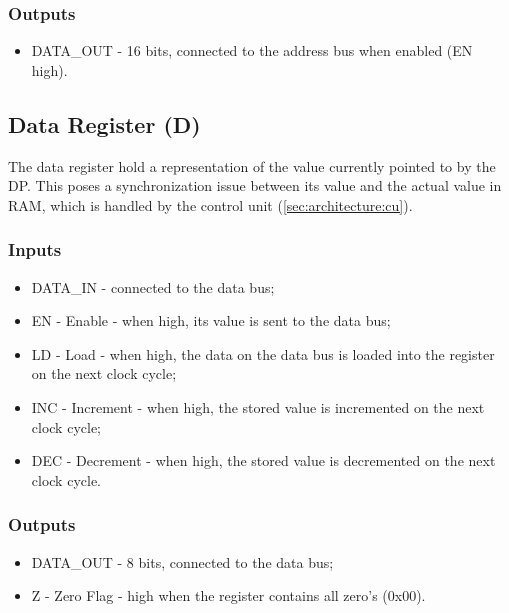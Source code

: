 \subsubsection*{Outputs}
\begin{itemize}
\item DATA\_OUT - 16 bits, connected to the address bus when enabled (EN high).
\end{itemize}

\subsection{Data Register (D)} \label{sec:architecture:d}
The data register hold a representation of the value currently pointed to by the DP. This poses a synchronization issue between its value and the actual value in RAM, which is handled by the control unit (\ref{sec:architecture:cu}).

\subsubsection*{Inputs}
\begin{itemize}
\item DATA\_IN - connected to the data bus;
\item EN - Enable - when high, its value is sent to the data bus;
\item LD - Load - when high, the data on the data bus is loaded into the register on the next clock cycle;
\item INC - Increment - when high, the stored value is incremented on the next clock cycle;
\item DEC - Decrement - when high, the stored value is decremented on the next clock cycle.
\end{itemize}

\subsubsection*{Outputs}
\begin{itemize}
\item DATA\_OUT - 8 bits, connected to the data bus;
\item Z - Zero Flag - high when the register contains all zero's (0x00).
\end{itemize}



